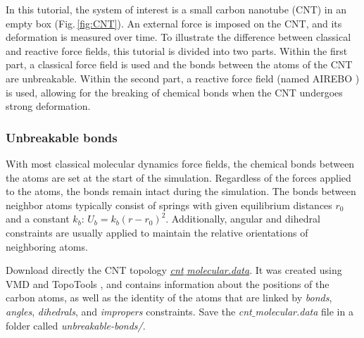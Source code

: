 \documentclass[9pt,tutorial]{livecoms}
\begin{document}
\noindent In this tutorial, the system of interest is a small carbon nanotube (CNT) in an empty box (Fig.\,\ref{fig:CNT}). An external force is imposed on the CNT, and its deformation is measured over time. To illustrate the difference between classical and reactive force fields, this tutorial is divided into two parts. Within the first part, a classical force field is used and the bonds between the atoms of the CNT are unbreakable. Within the second part, a reactive force field (named AIREBO \cite{stuart2000reactive}) is used, allowing for the breaking of chemical bonds when the CNT undergoes strong deformation.

\subsubsection{Unbreakable bonds}
\noindent With most classical molecular dynamics force fields, the chemical bonds between the atoms are set at the start of the simulation. Regardless of the forces applied to the atoms, the bonds remain intact during the simulation. The bonds between neighbor atoms typically consist of springs with given equilibrium distances $r_0$ and a constant $k_b$: $U_b = k_b \left( r - r_0 \right)^2$. Additionally, angular and dihedral constraints are usually applied to maintain the relative orientations of neighboring atoms.

Download directly the CNT topology \href{https://raw.githubusercontent.com/lammpstutorials/lammpstutorials-article/main/files/tutorial2/cnt_molecular.data}{\textit{cnt$\_$molecular.data}}. It was created using VMD and TopoTools \cite{kohlmeyer2017topotools}, and contains information about the positions of the carbon atoms, as well as the identity of the atoms that are linked by \textit{bonds}, \textit{angles}, \textit{dihedrals}, and \textit{impropers} constraints. Save the \textit{cnt$\_$molecular.data} file
in a folder called \textit{unbreakable-bonds/}.
\end{document}
